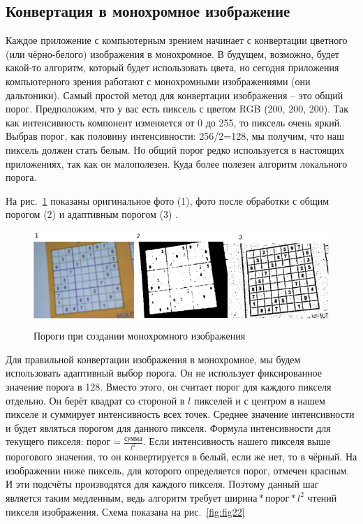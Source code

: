 \subsection{Конвертация в монохромное изображение}
Каждое приложение с компьютерным зрением начинает с конвертации цветного (или чёрно-белого) изображения в монохромное. В будущем, возможно, будет какой-то алгоритм, который будет использовать цвета, но сегодня приложения компьютерного зрения работают с монохромными изображениями (они дальтоники).
Самый простой метод для конвертации изображения – это общий порог. Предположим, что у вас есть пиксель с цветом RGB (200, 200, 200). Так как интенсивность компонент изменяется от 0 до 255, то пиксель очень яркий. Выбрав порог, как половину интенсивности: 256/2=128, мы получим, что наш пиксель должен стать белым. Но общий порог редко используется в настоящих приложениях, так как он малополезен. Куда более полезен алгоритм локального порога.

На рис.~\ref{fig:fig21} показаны оригинальное фото (1), фото после обработки с общим порогом (2) и адаптивным порогом (3) .

\begin{figure}[ht!]
  \centering
  \includegraphics[width=\textwidth]{inc/raster/design2-1.png}
  \caption{Пороги при создании монохромного изображения}
  \label{fig:fig21}
\end{figure}

Для правильной конвертации изображения в монохромное, мы будем использовать адаптивный выбор порога. Он не использует фиксированное значение порога в 128. Вместо этого, он считает порог для каждого пикселя отдельно. Он берёт квадрат со стороной в ${l}$ пикселей и с центром в нашем пикселе и суммирует интенсивность всех точек. Среднее значение интенсивности и будет являться порогом для данного пикселя. Формула интенсивности для текущего пикселя: $\text{порог}=\frac{\text{сумма}}{l^2}$. Если интенсивность нашего пикселя выше порогового значения, то он конвертируется в белый, если же нет, то в чёрный. На изображении ниже пиксель, для которого определяется порог, отмечен красным. И эти подсчёты производятся для каждого пикселя. Поэтому данный шаг является таким медленным, ведь алгоритм требует $\text{ширина} * \text{порог} *{l^2}$ чтений пикселя изображения. Схема показана на рис.~\ref{fig:fig22}

